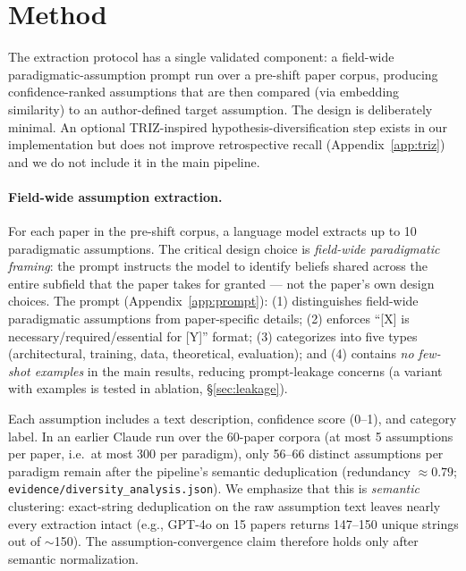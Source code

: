 \documentclass[11pt]{article}
\newcommand{\fpath}[1]{\mbox{}\nolinkurl{#1}}
\begin{document}
\section{Method}

The extraction protocol has a single validated component: a field-wide paradigmatic-assumption prompt run over a pre-shift paper corpus, producing confidence-ranked assumptions that are then compared (via embedding similarity) to an author-defined target assumption. The design is deliberately minimal. An optional TRIZ-inspired hypothesis-diversification step exists in our implementation but does not improve retrospective recall (Appendix~\ref{app:triz}) and we do not include it in the main pipeline.

\paragraph{Field-wide assumption extraction.}
For each paper in the pre-shift corpus, a language model extracts up to 10 paradigmatic assumptions. The critical design choice is \emph{field-wide paradigmatic framing}: the prompt instructs the model to identify beliefs shared across the entire subfield that the paper takes for granted --- not the paper's own design choices. The prompt (Appendix~\ref{app:prompt}): (1) distinguishes field-wide paradigmatic assumptions from paper-specific details; (2) enforces ``[X] is necessary/required/essential for [Y]'' format; (3) categorizes into five types (architectural, training, data, theoretical, evaluation); and (4) contains \emph{no few-shot examples} in the main results, reducing prompt-leakage concerns (a variant with examples is tested in ablation, \S\ref{sec:leakage}).

Each assumption includes a text description, confidence score (0--1), and category label. In an earlier Claude run over the 60-paper corpora (at most 5 assumptions per paper, i.e.\ at most 300 per paradigm), only 56--66 distinct assumptions per paradigm remain after the pipeline's semantic deduplication (redundancy ${\approx}0.79$; \fpath{evidence/diversity_analysis.json}). We emphasize that this is \emph{semantic} clustering: exact-string deduplication on the raw assumption text leaves nearly every extraction intact (e.g., GPT-4o on 15 papers returns 147--150 unique strings out of $\sim$150). The assumption-convergence claim therefore holds only after semantic normalization.
\end{document}
